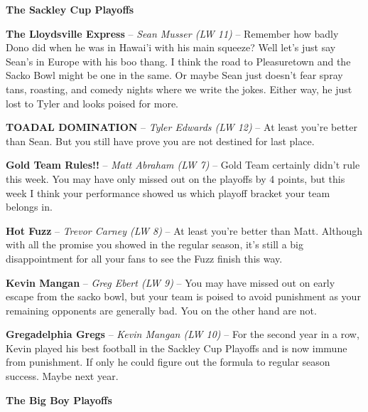 \documentclass[11pt,letterpaper]{article}
\begin{document}
\newpage
{}
\textbf{The Sackley Cup Playoffs}
\begin{etaremune}
\setcounter{enumi}{13}
\item \textbf{The Lloydsville Express} -- \textit{Sean Musser (LW 11)} -- Remember how badly Dono did when he was in Hawai'i with his main squeeze? Well let's just say Sean's in Europe with his boo thang. I think the road to Pleasuretown and the Sacko Bowl might be one in the same. Or maybe Sean just doesn't fear spray tans, roasting, and comedy nights where we write the jokes. Either way, he just lost to Tyler and looks poised for more. 
\item \textbf{TOADAL DOMINATION} -- \textit{Tyler Edwards (LW 12)} -- At least you're better than Sean. But you still have prove you are not destined for last place.
\item \textbf{Gold Team Rules!!} -- \textit{Matt Abraham (LW 7)} -- Gold Team certainly didn't rule this week. You may have only missed out on the playoffs by 4 points, but this week I think your performance showed us which playoff bracket your team belongs in.  
\item \textbf{Hot Fuzz} -- \textit{Trevor Carney (LW 8)} -- At least you're better than Matt. Although with all the promise you showed in the regular season, it's still a big disappointment for all your fans to see the Fuzz finish this way.
\item \textbf{Kevin Mangan} -- \textit{Greg Ebert (LW 9)} -- You may have missed out on early escape from the sacko bowl, but your team is poised to avoid punishment as your remaining opponents are generally bad. You on the other hand are not. 
\item \textbf{Gregadelphia Gregs} -- \textit{Kevin Mangan (LW 10)} -- For the second year in a row, Kevin played his best football in the Sackley Cup Playoffs and is now immune from punishment. If only he could figure out the formula to regular season success. Maybe next year. 
\end{etaremune}
\textbf{The Big Boy Playoffs}
\end{document}
